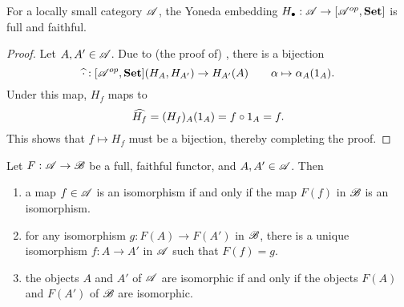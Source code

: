 \begin{corollary}
    For a locally small category $\mathscr A$, the Yoneda embedding $H_\bullet: \mathscr A\to[\mathscr A^{op},\mathbf{Set}]$ is full and faithful.
\end{corollary}
\begin{proof}
    Let $A, A'\in\mathscr A$. Due to (the proof of) , there is a bijection 
    \begin{equation*}
        \widehat{\cdot}: [\mathscr A^{op},\mathbf{Set}](H_A, H_{A'})\to H_{A'}(A)\qquad \alpha\mapsto\alpha_A(1_A).
    \end{equation*}
    Under this map, $H_f$ maps to 
    \begin{equation*}
        \widehat{H_f} = (H_f)_A(1_A) = f\circ 1_A = f.
    \end{equation*}
    This shows that $f\mapsto H_f$ must be a bijection, thereby completing the proof.
\end{proof}

\begin{lemma}
    Let $F: \mathscr A\to\mathscr B$ be a full, faithful functor, and $A, A'\in\mathscr A$. Then 
    \begin{enumerate}[label=(\alph*)]
        \item a map $f\in\mathscr A$ is an isomorphism if and only if the map $F(f)$ in $\mathscr B$ is an isomorphism. 
        \item for any isomorphism $g: F(A)\to F(A')$ in $\mathscr B$, there is a unique isomorphism $f: A\to A'$ in $\mathscr A$ such that $F(f) = g$. 
        \item the objects $A$ and $A'$ of $\mathscr A$ are isomorphic if and only if the objects $F(A)$ and $F(A')$ of $\mathscr B$ are isomorphic.
    \end{enumerate}
\end{lemma}